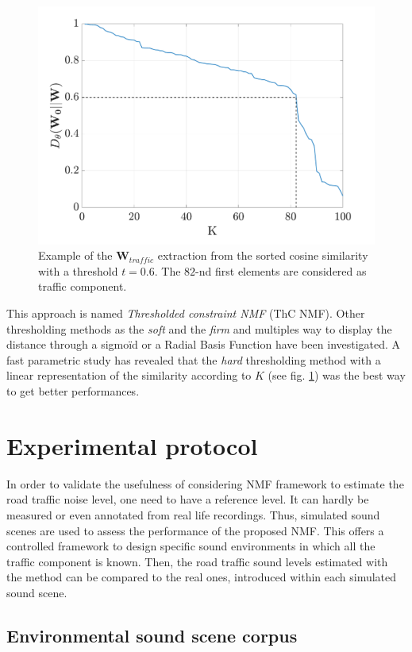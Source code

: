 \documentclass[twocolumn,a4paper,10pt]{article}
\begin{document}
\begin{figure}[hbtp]
\centering
\includegraphics[width=0.8\linewidth]{figures/distanceCosLinDisplay.pdf}
\caption{Example of the $\mathbf{W}_{traffic}$ extraction from the sorted cosine similarity with a threshold $t = 0.6$. The $82$-nd first elements are considered as traffic component.}
\label{fig:W_ThC_NMF}
\end{figure}

This approach is named \textit{Thresholded constraint NMF} (ThC NMF). Other thresholding methods as the \textit{soft} \cite{donoho1995noising}and the \textit{firm} \cite{fornasier2008iterative} and multiples way to display the distance through a sigmoïd or a Radial Basis Function have been investigated. A fast parametric study has revealed that the \textit{hard} thresholding method  with a linear representation of the similarity according to $K$ (see fig. \ref{fig:W_ThC_NMF}) was the best way to get better performances.


\section{Experimental protocol}\label{part:protocol}

In order to validate the usefulness of considering NMF framework to estimate the road traffic noise level, one need to have a reference level. It can hardly be measured or even annotated from real life recordings. Thus,  simulated sound scenes are used to assess the performance of the proposed NMF. This offers a controlled framework to design specific sound environments in which all the traffic component is known. Then, the road traffic sound levels estimated with the method can be compared to the real ones, introduced within each simulated sound scene.

\subsection{Environmental sound scene corpus}
\end{document}
